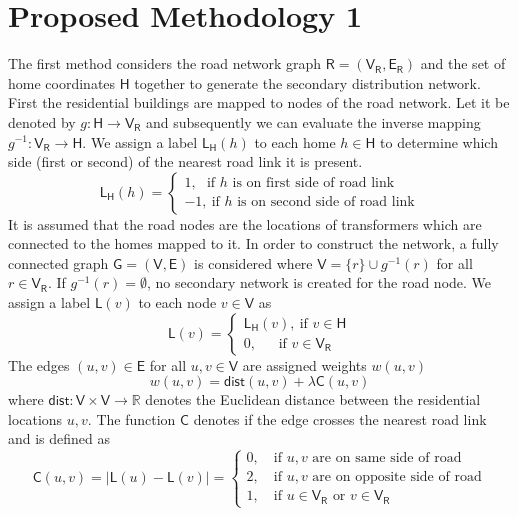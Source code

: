 \documentclass[11pt,letterpaper]{article}
\begin{document}
\section{Proposed Methodology 1}
The first method considers the road network graph $\mathsf{R}=(\mathsf{V_R},\mathsf{E_R})$ and the set of home coordinates $\mathsf{H}$ together to generate the secondary distribution network. First the residential buildings are mapped to nodes of the road network. Let it be denoted by $g:\mathsf{H}\rightarrow\mathsf{V_R}$ and subsequently we can evaluate the inverse mapping $g^{-1}:\mathsf{V_R}\rightarrow\mathsf{H}$. We assign a label $\mathsf{L_H}(h)$ to each home $h\in\mathsf{H}$ to determine which side (first or second) of the nearest road link it is present.
\begin{equation}
\mathsf{L_H}(h)=
\begin{cases}
1,~~~ \textrm{if }h\textrm{ is on first side of road link}\\
-1,~ \textrm{if }h\textrm{ is on second side of road link}
\end{cases}
\end{equation}
It is assumed that the road nodes are the locations of transformers which are connected to the homes mapped to it. In order to construct the network, a fully connected graph $\mathsf{G}=(\mathsf{V},\mathsf{E})$ is considered where $\mathsf{V}=\{r\}\cup g^{-1}(r)$ for all $r\in\mathsf{V_R}$. If $g^{-1}(r)=\emptyset$, no secondary network is created for the road node. We assign a label $\mathsf{L}(v)$ to each node $v\in\mathsf{V}$ as
\begin{equation}
\mathsf{L}(v)=
\begin{cases}
\mathsf{L_H}(v),~\textrm{if }v\in\mathsf{H}\\
0,~~~~~~~ \textrm{if }v\in\mathsf{V_R}
\end{cases}
\end{equation}
The edges $(u,v)\in\mathsf{E}$ for all $u,v\in\mathsf{V}$ are assigned weights $w(u,v)$
\begin{equation}
w(u,v)=\mathsf{dist}(u,v)+\lambda \mathsf{C}(u,v)
\end{equation}
where $\mathsf{dist}:\mathsf{V}\times\mathsf{V}\rightarrow\mathbb{R}$ denotes the Euclidean distance between the residential locations $u,v$. The function $\mathsf{C}$ denotes if the edge crosses the nearest road link and is defined as
\begin{equation}
\mathsf{C}(u,v)=|\mathsf{L}(u)-\mathsf{L}(v)|=
\begin{cases}
0,\quad \textrm{if }u,v\textrm{ are on same side of road}\\
2,\quad \textrm{if }u,v\textrm{ are on opposite side of road}\\
1,\quad \textrm{if }u\in\mathsf{V_R}\textrm{ or }v\in\mathsf{V_R}
\end{cases}
\end{equation}
\end{document}
